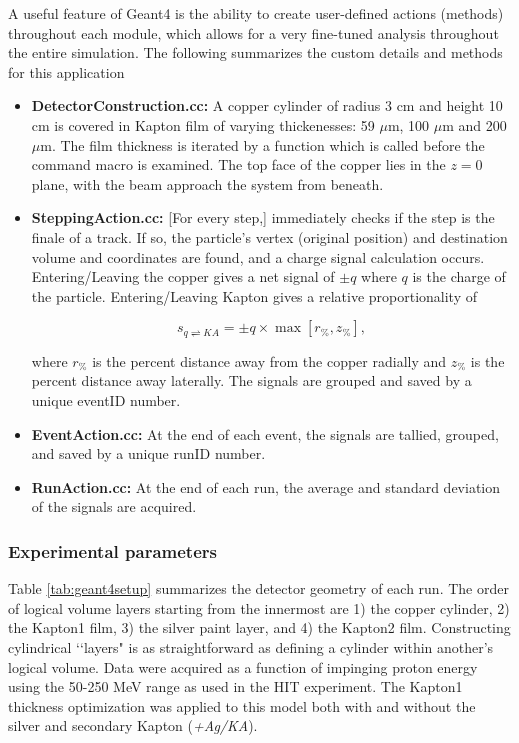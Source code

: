 \documentclass{mc2015}
\begin{document}
A useful feature of Geant4 is the ability to create user-defined actions (methods) throughout each module, which allows for a very fine-tuned analysis throughout the entire simulation.  The following summarizes the custom details and methods for this application

\begin{itemize}
\item \textbf{DetectorConstruction.cc:} A copper cylinder of radius 3 cm and height 10 cm is covered in Kapton film of varying thickenesses: 59 $\mu$m, 100 $\mu$m and 200 $\mu$m.  The film thickness is iterated by a function which is called before the command macro is examined.  The top face of the copper lies in the $z=0$ plane, with the beam approach the system from beneath.
\item \textbf{SteppingAction.cc:} [For every step,] immediately checks if the step is the finale of a track.  If so, the particle's vertex (original position) and destination volume and coordinates are found, and a charge signal calculation occurs.  Entering/Leaving the copper gives a net signal of $\pm q$ where $q$ is the charge of the particle.  Entering/Leaving Kapton gives a relative proportionality of

\begin{equation}
s_{q\rightleftharpoons KA} = \pm q\times\max\left[r_{\%}, z_{\%}\right], \label{eqn:s_KA}
\end{equation}

where $r_{\%}$ is the percent distance away from the copper radially and $z_{\%}$ is the percent distance away laterally.  The signals are grouped and saved by a unique eventID number.
\item \textbf{EventAction.cc:} At the end of each event, the signals are tallied, grouped, and saved by a unique runID number.
\item \textbf{RunAction.cc:} At the end of each run, the average and standard deviation of the signals are acquired.
\end{itemize}

\subsubsection{Experimental parameters}

Table \ref{tab:geant4setup} summarizes the detector geometry of each run.  The order of logical volume layers starting from the innermost are 1) the copper cylinder, 2) the Kapton1 film, 3) the silver paint layer, and 4) the Kapton2 film.  Constructing cylindrical \lq\lq layers" is as straightforward as defining a cylinder within another's logical volume.  Data were acquired as a function of impinging proton energy using the 50-250 MeV range as used in the HIT experiment.  The Kapton1 thickness optimization was applied to this model both with and without the silver and secondary Kapton (\emph{+Ag/KA}).
\end{document}
